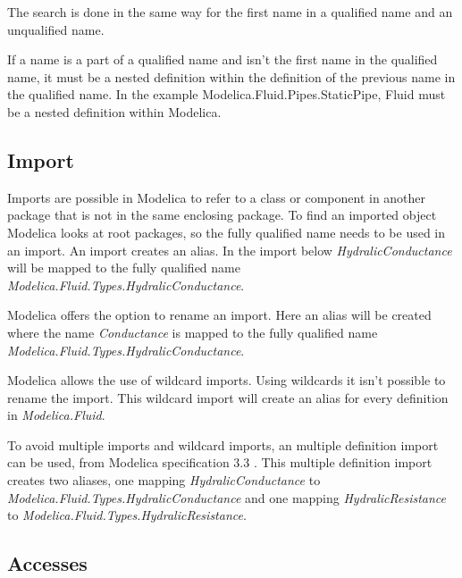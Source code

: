 \documentclass{cslthse-msc}
\begin{document}
The search is done in the same way for the first name in a qualified name and an unqualified name.

If a name is a part of a qualified name and isn't the first name in the qualified name, it must be a nested definition within the definition of the previous name in the qualified name. In the example Modelica.Fluid.Pipes.StaticPipe, Fluid must be a nested definition within Modelica.\cite{modelicamodelica, tillermodelica}

\subsection{Import}
Imports are possible in Modelica to refer to a class or component in another package that is not in the same enclosing package. To find an imported object Modelica looks at root packages, so the fully qualified name needs to be used in an import. An import creates an alias. In the import below \textit{HydralicConductance} will be mapped to the fully qualified name \textit{Modelica.Fluid.Types.HydralicConductance}.



Modelica offers the option to rename an import. Here an alias will be created where the name \textit{Conductance} is mapped to the fully qualified name \textit{Modelica.Fluid.Types.HydralicConductance}.



Modelica allows the use of wildcard imports. Using wildcards it isn't possible to rename the import. This wildcard import will create an alias for every definition in \textit{Modelica.Fluid}.



To avoid multiple imports and wildcard imports, an multiple definition import can be used, from Modelica specification 3.3 \cite{modelicamodelica}. This multiple definition import creates two aliases, one mapping \textit{HydralicConductance} to \textit{Modelica.Fluid.Types.HydralicConductance} and one mapping \textit{HydralicResistance} to \textit{Modelica.Fluid.Types.HydralicResistance}.



\subsection{Accesses}
\end{document}
